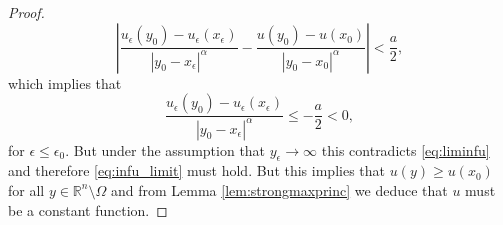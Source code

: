 \documentclass[11pt]{article}
\providecommand{\Rn}{\mathbb{R}^n}
\numberwithin{equation}{section}
\theoremstyle{definition}
\begin{document}
\begin{proof}
\begin{equation*}
   \left| \frac{u_{\epsilon}(y_0)-u_{\epsilon}(x_{\epsilon})}{|y_0-x_{\epsilon}|^{\alpha}}-\frac{u(y_0)-u(x_0)}{|y_0-x_0|^{\alpha}} \right| < \frac{a}{2},
\end{equation*}
which implies that 
\begin{equation*}
    \frac{u_{\epsilon}(y_0)-u_{\epsilon}(x_{\epsilon})}{|y_0-x_{\epsilon}|^{\alpha}} \leq -\frac{a}{2} <0,
\end{equation*}
for $\epsilon \leq \epsilon_0$. But under the assumption that $y_{\epsilon} \to \infty$ this contradicts \eqref{eq:liminfu} and therefore \eqref{eq:infu_limit} must hold.
 But this implies that $u(y) \geq u(x_0)$ for all $y \in \Rn \setminus \Omega$ and from Lemma \ref{lem:strongmaxprinc} we deduce that $u$ must be a constant function.
\end{proof}



\end{document}
